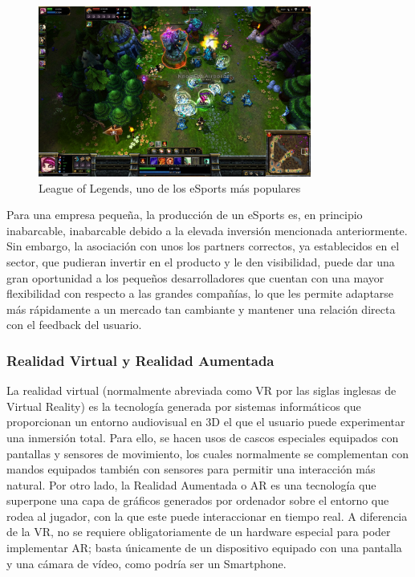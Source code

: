 \begin{figure}[h]
    \centering
    \includegraphics[width=0.8\textwidth]{images/estadodelarte/mercado/foto-lol}
    \caption{League of Legends, uno de los eSports más populares}
\end{figure}

Para una empresa pequeña, la producción de un eSports es, en principio inabarcable, inabarcable debido a la elevada inversión mencionada anteriormente. Sin embargo, la asociación con unos los partners correctos, ya establecidos en el sector, que pudieran invertir en el producto y le den visibilidad, puede dar una gran oportunidad a los pequeños desarrolladores que cuentan con una mayor flexibilidad con respecto a las grandes compañías, lo que les permite adaptarse más rápidamente a un mercado tan cambiante y mantener una relación directa con el feedback del usuario.

\subsubsection{Realidad Virtual y Realidad Aumentada}
La realidad virtual (normalmente abreviada como VR por las siglas inglesas de Virtual Reality) es la tecnología generada por sistemas informáticos que proporcionan un entorno audiovisual en 3D el que el usuario puede experimentar una inmersión total. Para ello, se hacen usos de cascos especiales equipados con pantallas y sensores de movimiento, los cuales normalmente se complementan con mandos equipados también con sensores para permitir una interacción más natural.
Por otro lado, la Realidad Aumentada o AR es una tecnología que superpone una capa de gráficos generados por ordenador sobre el entorno que rodea al jugador, con la que este puede interaccionar en tiempo real. A diferencia de la VR, no se requiere obligatoriamente de un hardware especial para poder implementar AR; basta únicamente de un dispositivo equipado con una pantalla y una cámara de vídeo, como podría ser un Smartphone.

